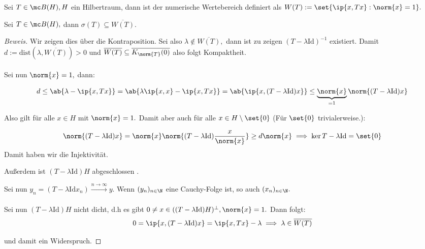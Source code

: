 \begin{definition} Sei $T \in \mc B(H), H$ ein Hilbertraum, dann ist der numerische Wertebereich definiert als $W(T) := \set{\ip{x, Tx}: \norm{x} = 1}.$ 
	
\end{definition}


\begin{theorem} \label{num_spec} Sei $T \in \mc B(H),$ dann $\sigma(T) \subseteq \overline{W(T)}.$
	
	\begin{proof}[Beweis] Wir zeigen dies über die Kontraposition. Sei also $\lambda \notin \overline{W(T)},$ dann ist zu zeigen $(T-\lambda\text{Id})^{-1}$ existiert. Damit $d := \text{dist}(\lambda, \overline{W(T)}) > 0$ und $\overline{W(T)} \subseteq \overline{K_{\norm{T}}(0)}$ also folgt Kompaktheit. \\ \\
		
		Sei nun $\norm{x} = 1,$ dann:
		
		\[d \leq \ab{\lambda - \ip{x, Tx}} = \ab{\lambda \ip{x, x} - \ip{x, Tx}} = \ab{\ip{x, (T-\lambda \text{Id})x}} \leq \underbrace{\norm{x}}_{= 1} \norm{(T-\lambda{\text{Id}})x}\]
		
		Also gilt für alle $x \in H$ mit $\norm{x} = 1.$ Damit aber auch für alle $x \in H\setminus \set{0}$ (Für $\set{0}$ trivialerweise.): \[\]
		
		\[\norm{(T-\lambda \text{Id})x} = \norm{x} \norm{(T-\lambda \text{Id})\frac{x}{\norm{x}}} \geq d \norm{x} \implies \ker{T - \lambda \text{Id}} = \set{0}\] Damit haben wir die Injektivität. %
		
		Außerdem ist $(T- \lambda \text{Id})H$ abgeschlossen .
		
		Sei nun $y_n = (T-\lambda \text{Id}x_n) \xrightarrow{n \to \infty} y.$ Wenn $(y_n)_{n \in \N}$ eine Cauchy-Folge ist, so auch $(x_n)_{n \in \N}.$ \\ \\
		
		Sei nun $(T- \lambda \text{Id})H$ nicht dicht, d.h es gibt $0 \not= x \in ((T-\lambda \text{Id})H)^{\perp}, \norm{x} = 1.$ Dann folgt: \[0 = \ip{x, (T- \lambda \text{Id})x} = \ip{x, Tx}-\lambda \implies \lambda \in \overline{W(T)}\]
		
		und damit ein Widerspruch. 
		
	\end{proof}
	
\end{theorem}


